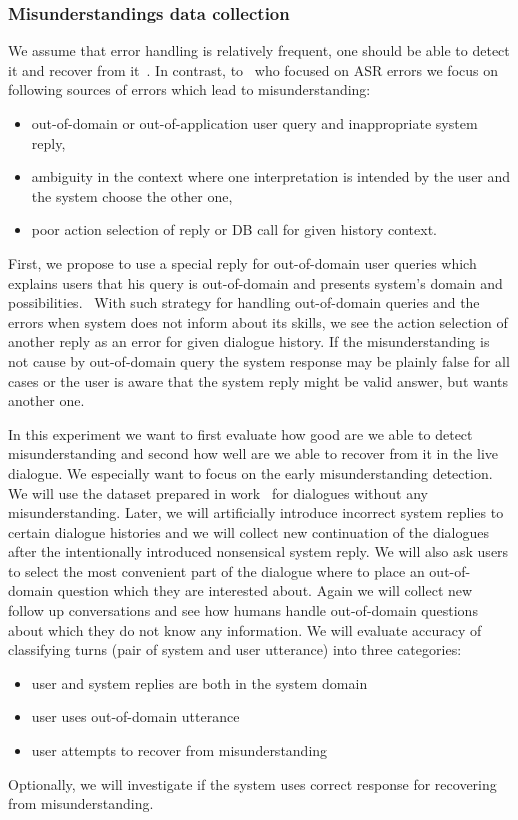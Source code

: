 \documentclass[11pt]{article}
\begin{document}
\subsubsection*{Misunderstandings data collection}
We assume that error handling is relatively frequent, one should be able to detect it and recover from it~\cite{skantze_error_2007}.
In contrast, to~\cite{skantze_error_2007} who focused on ASR errors we focus on following sources of errors which lead to misunderstanding:
\begin{itemize}
    \item out-of-domain or out-of-application user query and inappropriate system reply,
    \item ambiguity in the context where one interpretation is intended by the user and the system choose the other one,
    \item poor action selection of reply or DB call for given history context.
\end{itemize}
First, we propose to use a special reply for out-of-domain user queries which explains users that his query is out-of-domain and presents system's domain and possibilities.~\cite{platek_self_2015}
With such strategy for handling out-of-domain queries and the errors when system does not inform about its skills, we see the action selection of another reply as an error for given dialogue history.
If the misunderstanding is not cause by out-of-domain query the system response may be plainly false for all cases or the user is aware that the system reply might be valid answer, but wants another one.

In this experiment we want to first evaluate how good are we able to detect misunderstanding and second how well are we able to recover from it in the live dialogue. 
We especially want to focus on the early misunderstanding detection.
We will use the dataset prepared in work~\cite{platek2016wochat} for dialogues without any misunderstanding.
Later, we will artificially introduce incorrect system replies to certain dialogue histories and we will collect new continuation of the dialogues after the intentionally introduced nonsensical system reply. 
We will also ask users to select the most convenient part of the dialogue where to place an out-of-domain question which they are interested about.
Again we will collect new follow up conversations and see how humans handle out-of-domain questions about which they do not know any information.
We will evaluate accuracy of classifying turns (pair of system and user utterance) into three categories:
\begin{itemize}
    \item user and system replies are both in the system domain 
    \item user uses out-of-domain utterance 
    \item user attempts to recover from misunderstanding
\end{itemize}
Optionally, we will investigate if the system uses correct response for recovering from misunderstanding.
\end{document}
